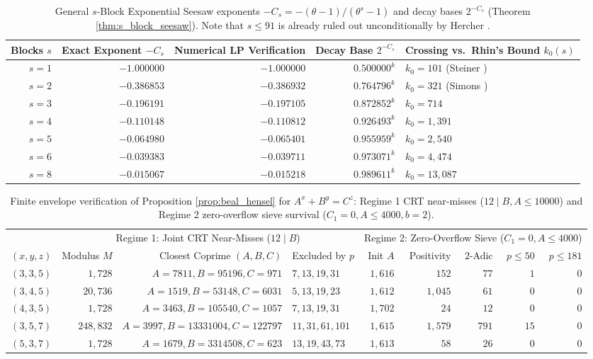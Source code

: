 \documentclass[11pt, a4paper]{amsart}
\theoremstyle{definition}
\begin{document}
\begin{table}[htbp]
\centering
\caption{General $s$-Block Exponential Seesaw exponents $-C_s = -(\theta - 1)/(\theta^s - 1)$ and decay bases $2^{-C_s}$ (Theorem \ref{thm:s_block_seesaw}). Note that $s \le 91$ is already ruled out unconditionally by Hercher \cite{Hercher2023}.}
\label{tab:s_block_seesaw}
\footnotesize
\begin{tabular}{@{}rrrrl@{}}
\toprule
Blocks $s$ & Exact Exponent $-C_s$ & Numerical LP Verification & Decay Base $2^{-C_s}$ & Crossing vs.\ Rhin's Bound $k_0(s)$ \\
\midrule
$s = 1$ & $-1.000000$ & $-1.000000$ & $0.500000^k$ & $k_0 = 101$ (Steiner \cite{Steiner1977}) \\
$s = 2$ & $-0.386853$ & $-0.386932$ & $0.764796^k$ & $k_0 = 321$ (Simons \cite{Simons2005}) \\
$s = 3$ & $-0.196191$ & $-0.197105$ & $0.872852^k$ & $k_0 = 714$ \\
$s = 4$ & $-0.110148$ & $-0.110812$ & $0.926493^k$ & $k_0 = 1,391$ \\
$s = 5$ & $-0.064980$ & $-0.065401$ & $0.955959^k$ & $k_0 = 2,540$ \\
$s = 6$ & $-0.039383$ & $-0.039711$ & $0.973071^k$ & $k_0 = 4,474$ \\
$s = 8$ & $-0.015067$ & $-0.015218$ & $0.989611^k$ & $k_0 = 13,087$ \\
\bottomrule
\end{tabular}
\end{table}

\begin{table}[htbp]
\centering
\caption{Finite envelope verification of Proposition \ref{prop:beal_hensel} for $A^x + B^y = C^z$: Regime 1 CRT near-misses ($12 \mid B, A \le 10000$) and Regime 2 zero-overflow sieve survival ($C_1 = 0, A \le 4000, b = 2$).}
\label{tab:beal_sieve}
\footnotesize
\begin{tabular}{@{}crrlrrrrr@{}}
\toprule
& \multicolumn{3}{c}{Regime 1: Joint CRT Near-Misses ($12 \mid B$)} & \multicolumn{5}{c}{Regime 2: Zero-Overflow Sieve ($C_1 = 0, A \le 4000$)} \\
\cmidrule(lr){2-4} \cmidrule(l){5-9}
$(x,y,z)$ & Modulus $M$ & Closest Coprime $(A, B, C)$ & Excluded by $p$ & Init $A$ & Positivity & $2$-Adic & $p \le 50$ & $p \le 181$ \\
\midrule
$(3,3,5)$ & $1,728$   & $A=7811, B=95196, C=971$       & $7, 13, 19, 31$   & $1,616$ & $152$   & $77$  & $1$  & $0$ \\
$(3,4,5)$ & $20,736$  & $A=1519, B=53148, C=6031$      & $5, 13, 19, 23$   & $1,612$ & $1,045$ & $61$  & $0$  & $0$ \\
$(4,3,5)$ & $1,728$   & $A=3463, B=105540, C=1057$     & $7, 13, 19, 31$   & $1,702$ & $24$    & $12$  & $0$  & $0$ \\
$(3,5,7)$ & $248,832$ & $A=3997, B=13331004, C=122797$ & $11, 31, 61, 101$ & $1,615$ & $1,579$ & $791$ & $15$ & $0$ \\
$(5,3,7)$ & $1,728$   & $A=1679, B=3314508, C=623$     & $13, 19, 43, 73$  & $1,613$ & $58$    & $26$  & $0$  & $0$ \\
\bottomrule
\end{tabular}
\end{table}
\end{document}
